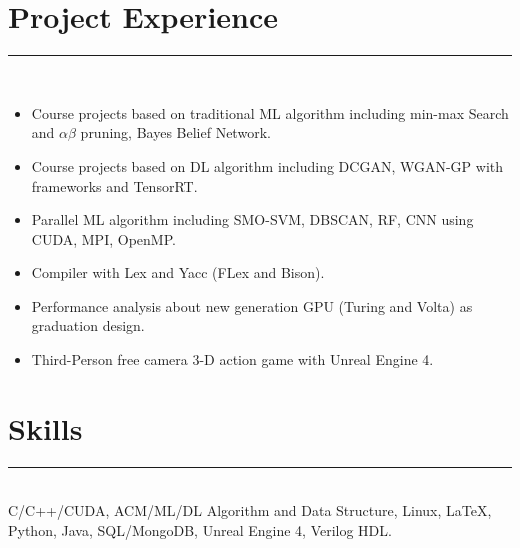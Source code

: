 \documentclass[a4paper]{article}
\begin{document}
		\section*{Project Experience}
		\rule[1pt]{19cm}{0.01em}\\
		\begin{itemize}
		\item Course projects based on traditional ML algorithm including min-max Search and $ \alpha\beta $ pruning, Bayes Belief Network.
		\item Course projects based on DL algorithm including DCGAN, WGAN-GP with frameworks and TensorRT.
		\item Parallel ML algorithm including SMO-SVM, DBSCAN, RF, CNN using CUDA, MPI, OpenMP.
		\item Compiler with Lex and Yacc (FLex and Bison).
		\item Performance analysis about new generation GPU (Turing and Volta) as graduation design.
		\item Third-Person free camera 3-D action game with Unreal Engine 4.
		\end{itemize}
		\section*{Skills}
		\rule[1pt]{19cm}{0.01em}\\
		C/C++/CUDA, ACM/ML/DL Algorithm and Data Structure, Linux, \LaTeX, Python, Java, SQL/MongoDB, Unreal Engine 4, Verilog HDL.
		
	
\end{document}
